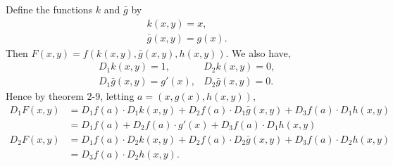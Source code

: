 \begin{solution}
    Define the functions $k$
    and $\bar{g}$ by
    \begin{align*}
        &k(x,y)=x,\\
        &\bar{g}(x,y)=g(x).
    \end{align*}
    Then $F(x,y)=
    f(k(x,y),\bar{g}
    (x,y),h(x,y))$. We also have,
    \begin{align*}
        &D_1k(x,y)=1,
        &D_2k(x,y)=0,\\
        &D_1\bar{g}(x,y)=g'(x),
        &D_2\bar{g}(x,y)=0.
    \end{align*}
    Hence by theorem 2-9,
    letting $a=(x,g(x),h(x,y))$,
    \begin{align*}
        D_1F(x,y)&=D_1f(a)
        \cdot D_1k(x,y)+
        D_2f(a)\cdot
        D_1\bar{g}(x,y)+D_3f(a)
        \cdot D_1h(x,y)\\
        &=D_1f(a)+D_2f(a)\cdot
        g'(x)+D_3f(a)\cdot
        D_1h(x,y)\\
        D_2F(x,y)&=D_1f(a)\cdot
        D_2k(x,y)+D_2f(a)\cdot
        D_2\bar{g}(x,y)+
        D_3f(a)\cdot D_2h(x,y)\\
        &=D_3f(a)\cdot D_2h(x,y).
    \end{align*}
\end{solution}